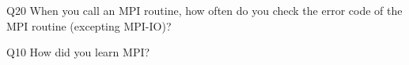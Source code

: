 \begin{description}%
\item{Q20} When you call an MPI routine, how often do you check the error code of the MPI routine  (excepting MPI-IO)?%
\item{Q10} How did you learn MPI?%
\end{description}%
